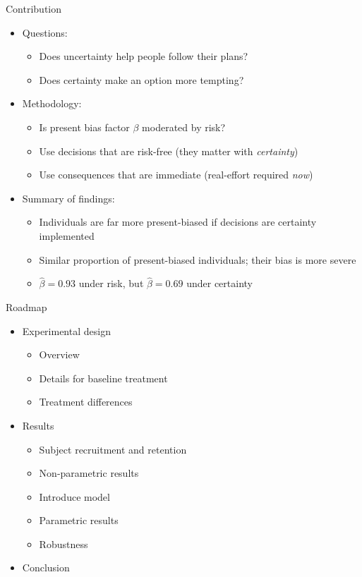 \documentclass[professionalfont,10pt]{beamer}
\begin{document}
\begin{frame}{Contribution}
\begin{itemize}[<+->]
\item \alert{Questions:}
\begin{itemize}[<+->]
\item Does uncertainty help people follow their plans?
\item Does certainty make an option more tempting?
\end{itemize}
\vspace{1\baselineskip}
\item \alert{Methodology:}
\begin{itemize}[<+->]
\item Is present bias factor $\beta$ moderated by risk?
\item Use decisions that are risk-free (they matter with \emph{certainty})
\item Use consequences that are immediate (real-effort required \emph{now})
\end{itemize}
\vspace{1\baselineskip}
\item \alert{Summary of findings:}
\begin{itemize}[<+->]
\item Individuals are far more present-biased if decisions are certainty implemented
\item Similar proportion of present-biased individuals; their bias is more severe
\item $\hat\beta = 0.93$ under risk, but $\hat\beta = 0.69$ under certainty
\end{itemize}
\end{itemize}
\end{frame}

\begin{frame}{Roadmap}
\begin{itemize}[<+->]
\item Experimental design
\begin{itemize}[<+->]
\item Overview
\item Details for baseline treatment
\item Treatment differences
\end{itemize}
\item Results
\begin{itemize}[<+->]
\item Subject recruitment and retention
\item Non-parametric results
\item Introduce model
\item Parametric results
\item Robustness
\end{itemize}
\item Conclusion
\end{itemize}
\end{frame}
\end{document}
